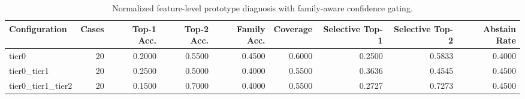 \begin{table}[t]
\centering
\caption{Normalized feature-level prototype diagnosis with family-aware confidence gating.}
\label{tab:dice_stressor_hierarchical_diagnosis}
\footnotesize
\begin{tabular}{lrrrrrrrr}
\toprule
Configuration & Cases & Top-1 Acc. & Top-2 Acc. & Family Acc. & Coverage & Selective Top-1 & Selective Top-2 & Abstain Rate \\
\midrule
tier0 & 20 & 0.2000 & 0.5500 & 0.4500 & 0.6000 & 0.2500 & 0.5833 & 0.4000 \\
tier0_tier1 & 20 & 0.2500 & 0.5000 & 0.4000 & 0.5500 & 0.3636 & 0.4545 & 0.4500 \\
tier0_tier1_tier2 & 20 & 0.1500 & 0.7000 & 0.4000 & 0.5500 & 0.2727 & 0.7273 & 0.4500 \\
\bottomrule
\end{tabular}

\end{table}
